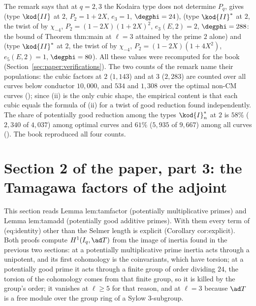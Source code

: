 \begin{sloppypar}
\begin{remark}\label{rem:paper:wild}
The remark says that at $q=2,3$ the Kodaira type does not determine $P_q$, gives  (type $\kod{II}$ at $2$, $P_2=1+2X$, $e_3=1$, $\degphi=24$),  (type
$\kod{II}^*$ at $2$, the twist of  by $\chi_{-4}$, $P_2=(1-2X)(1+2X)^2$, $e_3(E,2)=2$, $\degphi=288$: the bound of Theorem thm:main at $\ell=3$ attained by the prime $2$ alone) and
 (type $\kod{II}^*$ at $2$, the twist of  by $\chi_{-4}$, $P_2=(1-2X)(1+4X^2)$, $e_5(E,2)=1$, $\degphi=80$). All these values were recomputed for the book
(Section~\ref{sec:paper:verifications}). The two counts of the remark name their populations: the cubic factors at $2$ ($1{,}143$) and at $3$ ($2{,}283$) are counted
over all curves below conductor $10{,}000$, and $534$ and $1{,}308$ over the optimal non-CM curves (); since (ii) is the only cubic shape, the
empirical content is that each cubic equals the formula of (ii) for a twist of good reduction found independently. The share of potentially good reduction among
the types $\kod{I}_n^*$ at $2$ is $58\%$ ($2{,}340$ of $4{,}037$) among optimal curves and $61\%$ ($5{,}935$ of $9{,}667$) among all curves (). The book reproduced all
four counts.
\end{remark}

\section[Paper 2: Tamagawa factors]{Section 2 of the paper, part 3: the Tamagawa factors of the adjoint}\label{sec:paper:tamagawa}

This section reads Lemma lem:tamfactor (potentially multiplicative primes) and Lemma lem:tamadd (potentially good additive primes). With them every term
of (eq:identity) other than the Selmer length is explicit (Corollary cor:explicit). Both proofs compute $H^1(I_q,\ad T)$ from the image of inertia found in the previous two
sections: at a potentially multiplicative prime inertia acts through a unipotent, and its first cohomology is the coinvariants, which have torsion; at a potentially good prime it
acts through a finite group of order dividing $24$, the torsion of the cohomology comes from that finite group, so it is killed by the group's order; it vanishes at $\ell\ge5$ for that
reason, and at $\ell=3$ because $\ad T$ is a free module over the group ring of a Sylow $3$-subgroup.


\end{sloppypar}
